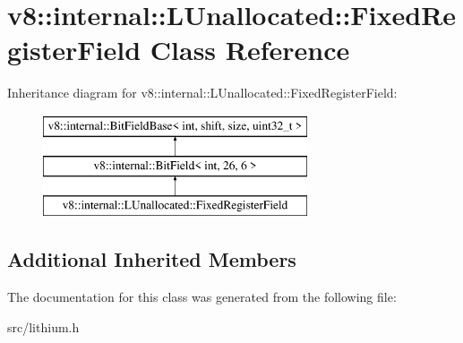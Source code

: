 \hypertarget{classv8_1_1internal_1_1_l_unallocated_1_1_fixed_register_field}{}\section{v8\+:\+:internal\+:\+:L\+Unallocated\+:\+:Fixed\+Register\+Field Class Reference}
\label{classv8_1_1internal_1_1_l_unallocated_1_1_fixed_register_field}
Inheritance diagram for v8\+:\+:internal\+:\+:L\+Unallocated\+:\+:Fixed\+Register\+Field\+:\begin{figure}[H]
\begin{center}
\leavevmode
\includegraphics[height=3.000000cm]{classv8_1_1internal_1_1_l_unallocated_1_1_fixed_register_field}
\end{center}
\end{figure}
\subsection*{Additional Inherited Members}


The documentation for this class was generated from the following file\+:\begin{DoxyCompactItemize}
\item 
src/lithium.\+h\end{DoxyCompactItemize}
